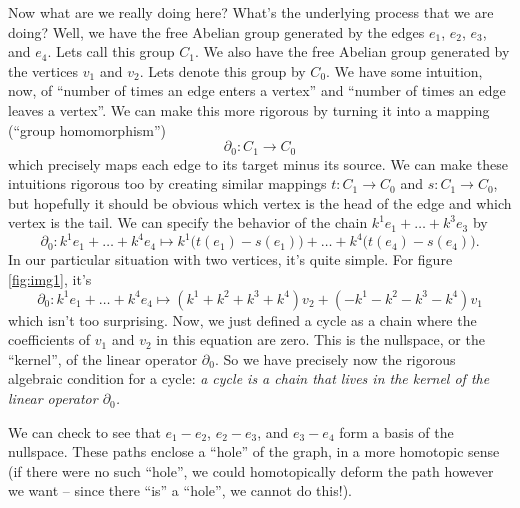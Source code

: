 Now what are we really doing here? What's the underlying process
that we are doing?
Well, we have the free Abelian group generated
by the edges $e_{1}$, $e_{2}$, $e_{3}$, and $e_{4}$. Lets call this group
$C_{1}$. We also have the free Abelian group generated by the
vertices $v_{1}$ and $v_{2}$. Lets denote this group by
$C_{0}$. We have some intuition, now, of ``number of times an
edge enters a vertex'' and ``number of times an edge leaves a
vertex''. We can make this more rigorous by turning it into a
mapping (``group homomorphism'') 
\begin{equation}%
\partial_{0}:C_{1}\to C_{0}
\end{equation}
which precisely maps each edge to its target minus its source. We
can make these intuitions rigorous too by creating similar
mappings $t:C_{1}\to C_{0}$ and $s:C_{1}\to C_{0}$, but hopefully
it should be obvious which vertex is the head of the edge and
which vertex is the tail. We can specify the behavior of the
chain $k^{1}e_{1}+\ldots+k^{3}e_{3}$ by
\begin{equation}%
\partial_{0}:k^{1}e_{1}+\ldots+k^{4}e_{4}\mapsto k^{1}\Big(t(e_{1})-s(e_{1})\Big)
+ \ldots + k^{4}\Big(t(e_{4})-s(e_{4})\Big).
\end{equation}
In our particular situation with two vertices, it's quite
simple. For figure \ref{fig:img1}, it's
\begin{equation}%
\partial_{0}:k^{1}e_{1}+\ldots+k^{4}e_{4}\mapsto
(k^{1}+k^{2}+k^{3}+k^{4})v_{2} + (-k^{1}-k^{2}-k^{3}-k^{4})v_{1}
\end{equation}
which isn't too surprising. Now, we just defined a cycle as a
chain where the coefficients of $v_{1}$ and $v_{2}$ in this
equation are zero. This is the nullspace, or the ``kernel'', of
the linear operator $\partial_{0}$. So we have precisely now the
rigorous algebraic condition for a cycle: \emph{a cycle is a
  chain that lives in the kernel of the linear operator
  $\partial_{0}$.}

We can check to see that $e_{1}-e_{2}$, $e_{2}-e_{3}$, and $e_{3}-e_{4}$ form a
basis of the nullspace. These paths enclose a ``hole'' of the
graph, in a more homotopic sense (if there were no such ``hole'',
we could homotopically deform the path however we want -- since
there ``is'' a ``hole'', we cannot do this!).


